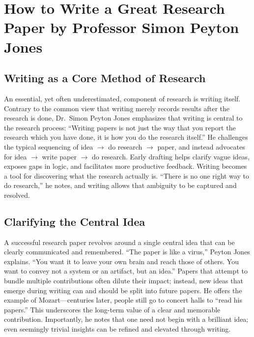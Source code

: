 
\section{How to Write a Great Research Paper by Professor Simon Peyton Jones}
\label{sec:great_research_paper}

\subsection*{Writing as a Core Method of Research}

An essential, yet often underestimated, component of research is writing itself.
Contrary to the common view that writing merely records results after the research is done, Dr.\ Simon Peyton Jones emphasizes that writing is central to the research process: ``Writing papers is not just the way that you report the research which you have done, it is how you do the research itself.''
He challenges the typical sequencing of idea $\rightarrow$ do research $\rightarrow$ paper, and instead advocates for idea $\rightarrow$ write paper $\rightarrow$ do research.
Early drafting helps clarify vague ideas, exposes gaps in logic, and facilitates more productive feedback.
Writing becomes a tool for discovering what the research actually is.
``There is no one right way to do research,'' he notes, and writing allows that ambiguity to be captured and resolved.

\subsection*{Clarifying the Central Idea}

A successful research paper revolves around a single central idea that can be clearly communicated and remembered.
``The paper is like a virus,'' Peyton Jones explains.
``You want it to leave your own brain and reach those of others.
You want to convey not a system or an artifact, but an idea.''
Papers that attempt to bundle multiple contributions often dilute their impact; instead, new ideas that emerge during writing can and should be split into future papers.
He offers the example of Mozart---centuries later, people still go to concert halls to ``read his papers.''
This underscores the long-term value of a clear and memorable contribution.
Importantly, he notes that one need not begin with a brilliant idea; even seemingly trivial insights can be refined and elevated through writing.


